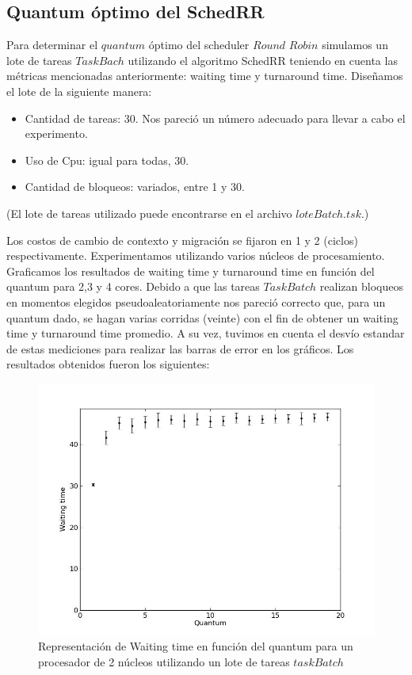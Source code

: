 \subsection{Quantum óptimo del SchedRR}

Para determinar el $quantum$ óptimo del scheduler $Round$ $Robin$ simulamos un lote de tareas $TaskBach$ utilizando el algoritmo SchedRR teniendo en cuenta las métricas mencionadas anteriormente: waiting time y turnaround time. Diseñamos el lote de la siguiente manera:
\begin{itemize}
	\item Cantidad de tareas: 30. Nos pareció un número adecuado para llevar a cabo el experimento.
	\item Uso de Cpu: igual para todas, 30.
	\item Cantidad de bloqueos: variados, entre 1 y 30.
\end{itemize}
(El lote de tareas utilizado puede encontrarse en el archivo $loteBatch.tsk$.)

Los costos de cambio de contexto y migración se fijaron en 1 y 2 (ciclos) respectivamente. Experimentamos utilizando varios núcleos de procesamiento.
Graficamos los resultados de waiting time y turnaround time en función del quantum para 2,3 y 4 cores. Debido a que las tareas $TaskBatch$ realizan bloqueos en momentos elegidos pseudoaleatoriamente nos pareció correcto que, para un quantum dado, se hagan varias corridas (veinte) con el fin de obtener un waiting time y turnaround time promedio. A su vez, tuvimos en cuenta el desvío estandar de estas mediciones para realizar las barras de error en los gráficos. Los resultados obtenidos fueron los siguientes:

\begin{figure}[H]
	\begin{center}
		  \includegraphics[scale=0.3]{graficos/cores_2_wt.jpg}
		  \caption{Representación de Waiting time en función del quantum para un procesador de 2 núcleos utilizando un lote de tareas $taskBatch$}
		  \label{fig:contra1}
	\end{center}
\end{figure}

